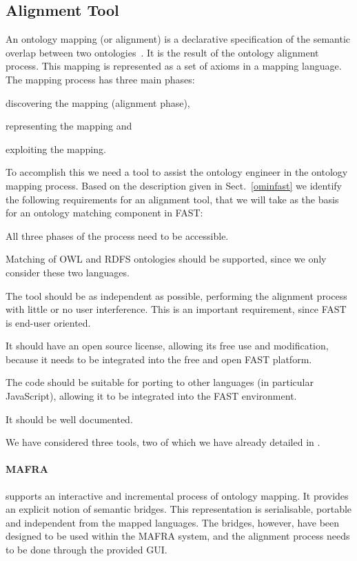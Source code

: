 \subsection{Alignment Tool}
\label{alignmenttool}

An ontology mapping (or alignment) is a declarative specification of the semantic overlap between two ontologies~\cite{debruin2005wsml}. It is the result of the ontology alignment process. This mapping is represented as a set of axioms in a mapping language. The mapping process has three main phases:
\begin{inparaenum}[(1)]
    \item discovering the mapping (alignment phase), 
    \item representing the mapping and 
    \item exploiting the mapping.
\end{inparaenum}  

To accomplish this we need a tool to assist the ontology engineer in the ontology mapping process.
Based on the description given in Sect.~\ref{ominfast} we identify the following requirements for an alignment tool, that we will take as the basis for an ontology matching component in FAST:
\begin{inparaenum}[(i)]
\item All three phases of the process need to be accessible.
\item Matching of OWL and RDFS ontologies should be supported, since we only consider these two languages.
\item The tool should be as independent as possible, performing the alignment process with little or no user interference. This is an important requirement, since FAST is end-user oriented.
\item It should have an open source license, allowing its free use and modification, because it needs to be integrated into the free and open FAST platform.
\item The code should be suitable for porting to other languages (in particular JavaScript), allowing it to be integrated into the FAST environment.
\item It should be well documented.
\end{inparaenum}

We have considered three tools, two of which we have already detailed in \cite{ambrus2009mediation}.
\paragraph{MAFRA} \cite{maedche2002mafra} supports an interactive and incremental process of ontology mapping. It provides an explicit notion of semantic bridges. This representation is serialisable, portable and independent from the mapped languages. The bridges, however, have been designed to be used within the MAFRA system, and the alignment process needs to be done through the provided GUI.

